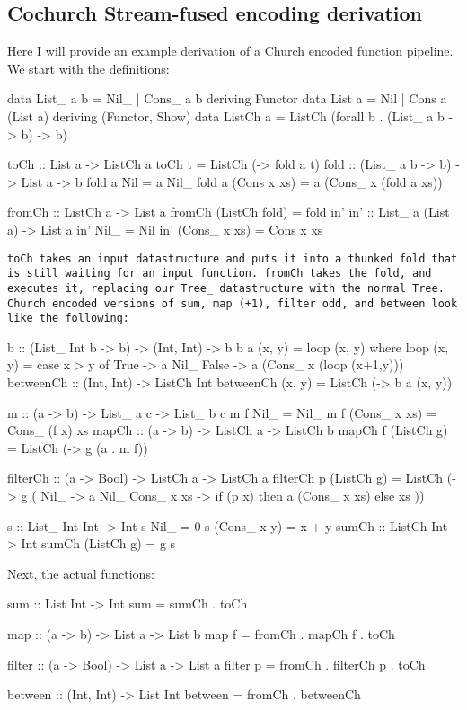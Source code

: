 
\subsection{Cochurch Stream-fused encoding derivation}\label{app:church_stream}
Here I will provide an example derivation of a Church encoded function pipeline.
We start with the definitions:
\begin{spec}
data List_ a b = Nil_ | Cons_ a b deriving Functor
data List a = Nil | Cons a (List a) deriving (Functor, Show)
data ListCh a = ListCh (forall b . (List_ a b -> b) -> b)

toCh :: List a -> ListCh a
toCh t = ListCh (\a -> fold a t)
fold :: (List_ a b -> b) -> List a -> b
fold a Nil = a Nil_
fold a (Cons x xs) = a (Cons_ x (fold a xs))

fromCh :: ListCh a -> List a
fromCh (ListCh fold) = fold in'
in' :: List_ a (List a) -> List a
in' Nil_ = Nil
in' (Cons_ x xs) = Cons x xs
\end{spec}
\tt{toCh} takes an input datastructure and puts it into a thunked fold that is still waiting for an input function.
\tt{fromCh} takes the fold, and executes it, replacing our Tree\_ datastructure with the normal Tree.
Church encoded versions of sum, map (+1), filter odd, and between look like the following:
\begin{spec}
b :: (List_ Int b -> b) -> (Int, Int) -> b
b a (x, y) = loop (x, y)
  where loop (x, y) = case x > y of
    True -> a Nil_
    False -> a (Cons_ x (loop (x+1,y)))
betweenCh :: (Int, Int) -> ListCh Int
betweenCh (x, y) = ListCh (\a -> b a (x, y))

m :: (a -> b) -> List_ a c -> List_ b c
m f Nil_ = Nil_
m f (Cons_ x xs) = Cons_ (f x) xs
mapCh :: (a -> b) -> ListCh a -> ListCh b
mapCh f (ListCh g) = ListCh (\a -> g (a . m f))

filterCh :: (a -> Bool) -> ListCh a -> ListCh a
filterCh p (ListCh g) = ListCh (\a -> g (\case
   Nil_ -> a Nil_
   Cons_ x xs -> if (p x) then a (Cons_ x xs) else xs
 ))

s :: List_ Int Int -> Int
s Nil_ = 0
s (Cons_ x y) = x + y
sumCh :: ListCh Int -> Int
sumCh (ListCh g) = g s
\end{spec}
Next, the actual functions:
\begin{spec}
sum :: List Int -> Int
sum = sumCh . toCh

map :: (a -> b) -> List a -> List b
map f = fromCh . mapCh f . toCh

filter :: (a -> Bool) -> List a -> List a
filter p = fromCh . filterCh p . toCh

between :: (Int, Int) -> List Int
between = fromCh . betweenCh
\end{spec}
